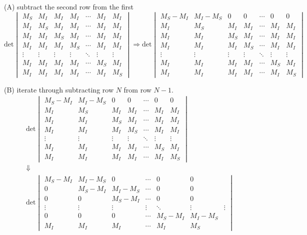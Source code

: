 (A) subtract the second row from the first
\begin{equation}
\mathrm{det}
\begin{vmatrix}
M_S & M_I & M_I & M_I & \cdots & M_I & M_I \\
M_I & M_S & M_I & M_I & \cdots & M_I & M_I \\
M_I & M_I & M_S & M_I & \cdots & M_I & M_I \\
M_I & M_I & M_I & M_S & \cdots & M_I & M_I \\
\vdots & \vdots & \vdots & \vdots & \ddots & \vdots & \vdots \\
M_I & M_I & M_I & M_I & \cdots & M_S & M_I \\
M_I & M_I & M_I & M_I & \cdots & M_I & M_S 
\end{vmatrix}
\Rightarrow
\mathrm{det}
\begin{vmatrix}
M_S-M_I & M_I-M_S & 0 & 0 & \cdots & 0 & 0 \\
M_I & M_S & M_I & M_I & \cdots & M_I & M_I \\
M_I & M_I & M_S & M_I & \cdots & M_I & M_I \\
M_I & M_I & M_I & M_S & \cdots & M_I & M_I \\
\vdots & \vdots & \vdots & \vdots & \ddots & \vdots & \vdots \\
M_I & M_I & M_I & M_I & \cdots & M_S & M_I \\
M_I & M_I & M_I & M_I & \cdots & M_I & M_S 
\end{vmatrix}
\end{equation}

(B) iterate through subtracting row $N$ from row $N-1$.
\begin{eqnarray}
&\mathrm{det}
\begin{vmatrix}
M_S-M_I & M_I-M_S & 0 & 0 & \cdots & 0 & 0 \\
M_I & M_S & M_I & M_I & \cdots & M_I & M_I \\
M_I & M_I & M_S & M_I & \cdots & M_I & M_I \\
M_I & M_I & M_I & M_S & \cdots & M_I & M_I \\
\vdots & \vdots & \vdots & \vdots & \ddots & \vdots & \vdots \\
M_I & M_I & M_I & M_I & \cdots & M_S & M_I \\
M_I & M_I & M_I & M_I & \cdots & M_I & M_S 
\end{vmatrix}&
\\
&\Downarrow&\\
&\mathrm{det}
\begin{vmatrix}
M_S-M_I & M_I-M_S & 0       &  \cdots & 0 & 0 \\
0       & M_S-M_I & M_I-M_S &  \cdots & 0 & 0 \\
0 & 0 & M_S-M_I & \cdots & 0 & 0 \\
\vdots & \vdots & \vdots & \vdots & \ddots & \vdots & \vdots \\
0 & 0 & 0 & \cdots & M_S-M_I & M_I-M_S \\
M_I & M_I & M_I & \cdots & M_I & M_S 
\end{vmatrix}&
\end{eqnarray}

